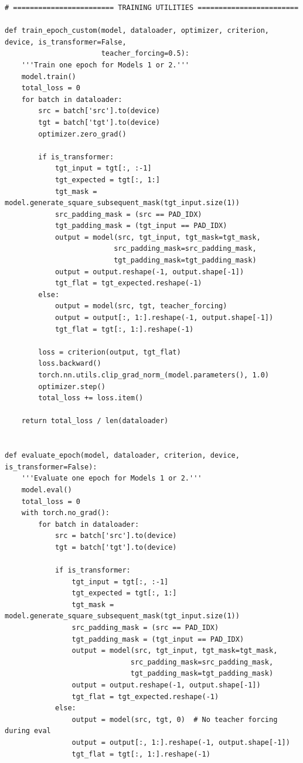 \documentclass[12pt,a4paper,oneside]{report}
\begin{document}
\begin{Verbatim}[commandchars=\\\{\},breaklines=true,breakanywhere=true,fontsize=\scriptsize,frame=leftline,framesep=2mm,rulecolor=\color{gray}]
# ======================== TRAINING UTILITIES ========================

def train_epoch_custom(model, dataloader, optimizer, criterion, device, is_transformer=False,
                       teacher_forcing=0.5):
    '''Train one epoch for Models 1 or 2.'''
    model.train()
    total_loss = 0
    for batch in dataloader:
        src = batch['src'].to(device)
        tgt = batch['tgt'].to(device)
        optimizer.zero_grad()

        if is_transformer:
            tgt_input = tgt[:, :-1]
            tgt_expected = tgt[:, 1:]
            tgt_mask = model.generate_square_subsequent_mask(tgt_input.size(1))
            src_padding_mask = (src == PAD_IDX)
            tgt_padding_mask = (tgt_input == PAD_IDX)
            output = model(src, tgt_input, tgt_mask=tgt_mask,
                          src_padding_mask=src_padding_mask,
                          tgt_padding_mask=tgt_padding_mask)
            output = output.reshape(-1, output.shape[-1])
            tgt_flat = tgt_expected.reshape(-1)
        else:
            output = model(src, tgt, teacher_forcing)
            output = output[:, 1:].reshape(-1, output.shape[-1])
            tgt_flat = tgt[:, 1:].reshape(-1)

        loss = criterion(output, tgt_flat)
        loss.backward()
        torch.nn.utils.clip_grad_norm_(model.parameters(), 1.0)
        optimizer.step()
        total_loss += loss.item()

    return total_loss / len(dataloader)


def evaluate_epoch(model, dataloader, criterion, device, is_transformer=False):
    '''Evaluate one epoch for Models 1 or 2.'''
    model.eval()
    total_loss = 0
    with torch.no_grad():
        for batch in dataloader:
            src = batch['src'].to(device)
            tgt = batch['tgt'].to(device)

            if is_transformer:
                tgt_input = tgt[:, :-1]
                tgt_expected = tgt[:, 1:]
                tgt_mask = model.generate_square_subsequent_mask(tgt_input.size(1))
                src_padding_mask = (src == PAD_IDX)
                tgt_padding_mask = (tgt_input == PAD_IDX)
                output = model(src, tgt_input, tgt_mask=tgt_mask,
                              src_padding_mask=src_padding_mask,
                              tgt_padding_mask=tgt_padding_mask)
                output = output.reshape(-1, output.shape[-1])
                tgt_flat = tgt_expected.reshape(-1)
            else:
                output = model(src, tgt, 0)  # No teacher forcing during eval
                output = output[:, 1:].reshape(-1, output.shape[-1])
                tgt_flat = tgt[:, 1:].reshape(-1)


\end{Verbatim}
\end{document}
